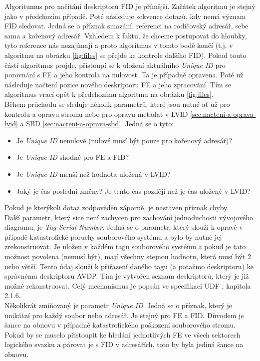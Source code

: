 Algoritumus pro načítání deskriptorů FID je přímější. Začátek algoritmu je stejný jako v předchozím případě. Poté následuje sekvence dotazů, kdy nemá význam FID sledovat. Jedná se o příznak smazání, referenci na rodičovský adresář, sebe sama a kořenový adresář. Vzhledem k faktu, že chceme postupovat do hloubky, tyto reference nás nezajímají a proto algoritmus v tomto bodě končí (t.j. v algoritmu na obrázku \ref{fig:files} se přejde ke kontrole dalšího FID). Pokud touto částí algoritmus projde, přistoupí se k uložení aktuálního \textit{Unique ID} pro porovnání s FE a jeho kontrola na nulovost. Ta je případně opravena. Poté už následuje načtení pozice nového deskriptoru FE a jeho zpracování. Tím se algoritmus vrací opět k předchozímu algoritmu na obrázku \ref{fig:files}.\\
Během průchodu se sleduje několik parametrů, které jsou nutné ať už pro kontrolu a opravu stromu nebo pro opravu metadat v LVID \ref{sec:nacteni-a-oprava-lvid} a SBD \ref{sec:nacteni-a-oprava-sbd}. Jedná se o tyto:
\begin{itemize}
    \item Je \textit{Unique ID} nenulové (nulové musí být pouze pro kořenový adresář)?
    \item Je \textit{Unique ID} shodné pro FE a FID?
    \item Je \textit{Unique ID} menší než hodnota uložená v LVID?
    \item Jaký je čas poslední změny? Je tento čas později než je čas uložený v LVID? 
\end{itemize}
Pokud je kterýkoli dotaz zodpověděn záporně, je nastaven příznak chyby.\\
Další parametr, který sice není zachycen pro zachování jednoduchosti vývojového diagramu, je \textit{Tag Serial Number}. Jedná se o parametr, který slouží k opravě v případě katastrofické poruchy souborového systému a bylo by nutné jej zrekonstruovat. Je uložen v každém tagu souborového systému a pokud je tato možnost povolena (nemusí být), mají všechny stejnou hodnotu, která musí být 2 nebo větší. Tento údaj slouží k přiřazení daného tagu (a potažmo deskriptoru) ke správnému deskriptoru AVDP. Tím je vytvořen seznam deskriptorů, který je již možné rekonstruovat. Celý mechanismus je popsán ve specifikaci UDF \cite{osta-udf-0201}, kapitola 2.1.6.\\
Několikrát zmiňovaný je parametr \textit{Unique ID}. Jedná se o příznak, který je unikátní pro každý soubor nebo adresář. Je stejný pro FE a FID. Důvodem je šance na obnovu v případně katastrofického poškození souborového stromu. Pokud by se muselo přistoupit ke hledání jednotlivých FE ve všech sektorech logického svazku a párovat je s FID v adresářích, toto by byla jediná šance na obnovu.\\
